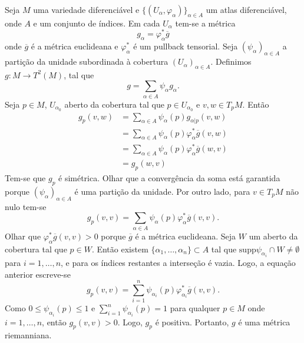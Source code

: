 \begin{demonstracao}
	Seja $M$ uma variedade diferenciável e $\{ (U_{\alpha}, \varphi_{\alpha}) \}_{\alpha \in A}$ um atlas diferenciável, onde $A$ e um conjunto de índices. Em cada $U_{\alpha}$ tem-se a métrica
	\begin{equation*}
		g_{\alpha} = \varphi_{\alpha}^* \overline{g}
	\end{equation*}
	onde $\overline{g}$ é a métrica euclideana e $\varphi_{\alpha}^*$ é um pullback tensorial. Seja $(\psi_{\alpha})_{\alpha \in A}$ a partição da unidade subordinada à cobertura $(U_{\alpha})_{\alpha \in A}$. Definimos $g: M \rightarrow T^2(M)$, tal que
	\begin{equation*}
		g = \sum_{\alpha \in A} \psi_{\alpha} g_{\alpha}.
	\end{equation*}
	Seja $p \in M$, $U_{\alpha_0}$ aberto da cobertura tal que $p \in U_{\alpha_0}$ e $v,w \in T_pM$. Então
	\begin{align*}
		g_p(v,w) &= \sum_{\alpha \in A} \psi_{\alpha}(p) g_{\alpha | p}(v,w)\\
		&= \sum_{\alpha \in A} \psi_{\alpha}(p) \varphi_{\alpha}^* \overline{g}(v,w)\\
		&= \sum_{\alpha \in A} \psi_{\alpha}(p) \varphi_{\alpha}^* \overline{g}(w,v)\\
		&= g_p(w,v)
	\end{align*}
	Tem-se que $g_p$ é simétrica. Olhar que a convergência da soma está garantida porque $(\psi_{\alpha})_{\alpha \in A}$ é uma partição da unidade. Por outro lado, para $v \in T_pM$ não nulo tem-se
	\begin{equation*}
		g_p(v,v) = \sum_{\alpha \in A} \psi_{\alpha}(p) \varphi_{\alpha}^* \overline{g}(v,v).
	\end{equation*}
	Olhar que $\varphi_{\alpha}^* \overline{g}(v,v) > 0$ porque $\overline{g}$ é a métrica euclideana. Seja $W$ um aberto da cobertura tal que $p \in W$. Então existem $\{ \alpha_1, \ldots, \alpha_n \} \subset A$ tal que $\text{supp} \psi_{\alpha_i} \cap W \neq \emptyset$ para $i=1, \ldots, n$, e para os índices restantes a interseção é vazia. Logo, a equação anterior escreve-se
	\begin{equation*}
	g_p(v,v) = \sum_{i=1}^n \psi_{\alpha_i}(p) \varphi_{\alpha_i}^* \overline{g}(v,v).
	\end{equation*}
	Como $0 \leq \psi_{\alpha_i}(p) \leq 1$ e $\sum_{i=1}^n \psi_{\alpha_i}(p) = 1$ para qualquer $p \in M$ onde $i=1,\ldots,n$, então $g_p(v,v) > 0$. Logo, $g_p$ é positiva. Portanto, $g$ é uma métrica riemanniana.
\end{demonstracao}

